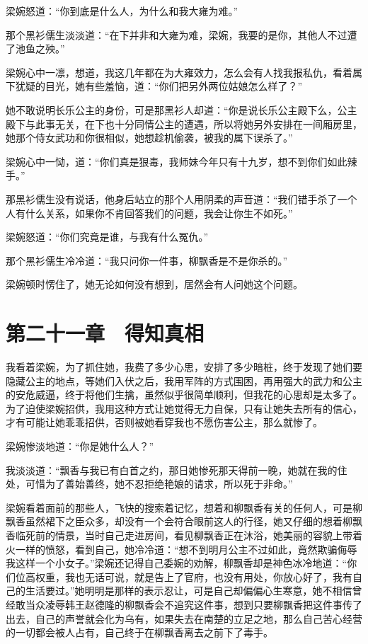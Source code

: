 梁婉怒道：“你到底是什么人，为什么和我大雍为难。”

那个黑衫儒生淡淡道：“在下并非和大雍为难，梁婉，我要的是你，其他人不过遭了池鱼之殃。”

梁婉心中一凛，想道，我这几年都在为大雍效力，怎么会有人找我报私仇，看着属下犹疑的目光，她有些羞恼，道：“你们把另外两位姑娘怎么样了？”

她不敢说明长乐公主的身份，可是那黑衫人却道：“你是说长乐公主殿下么，公主殿下与此事无关，在下也十分同情公主的遭遇，所以将她另外安排在一间厢房里，她那个侍女武功和你很相似，她想趁机偷袭，被我的属下误杀了。”

梁婉心中一恸，道：“你们真是狠毒，我师妹今年只有十九岁，想不到你们如此辣手。”

那黑衫儒生没有说话，他身后站立的那个人用阴柔的声音道：“我们错手杀了一个人有什么关系，如果你不肯回答我们的问题，我会让你生不如死。”

梁婉怒道：“你们究竟是谁，与我有什么冤仇。”

那个黑衫儒生冷冷道：“我只问你一件事，柳飘香是不是你杀的。”

梁婉顿时愣住了，她无论如何没有想到，居然会有人问她这个问题。

\chapter{第二十一章　得知真相}

我看着梁婉，为了抓住她，我费了多少心思，安排了多少暗桩，终于发现了她们要隐藏公主的地点，等她们入伏之后，我用军阵的方式围困，再用强大的武力和公主的安危威逼，终于将他们生擒，虽然似乎很简单顺利，但我花的心思却是太多了。为了迫使梁婉招供，我用这种方式让她觉得无力自保，只有让她失去所有的信心，才有可能让她乖乖招供，否则被她看穿我也不愿伤害公主，那么就惨了。

梁婉惨淡地道：“你是她什么人？”

我淡淡道：“飘香与我已有白首之约，那日她惨死那天得前一晚，她就在我的住处，可惜为了善始善终，她不忍拒绝艳娘的请求，所以死于非命。”

梁婉看着面前的那些人，飞快的搜索着记忆，想着和柳飘香有关的任何人，可是柳飘香虽然裙下之臣众多，却没有一个会符合眼前这人的行径，她又仔细的想着柳飘香临死前的情景，当时自己走进房间，看见柳飘香正在沐浴，她美丽的容貌上带着火一样的愤怒，看到自己，她冷冷道：“想不到明月公主不过如此，竟然欺骗侮辱我这样一个小女子。”梁婉还记得自己委婉的劝解，柳飘香却是神色冰冷地道：“你们位高权重，我也无话可说，就是告上了官府，也没有用处，你放心好了，我有自己的生活要过。”她明明是那样的表示忍让，可是自己却偏偏心生寒意，她不相信曾经敢当众凌辱韩王赵德隆的柳飘香会不追究这件事，想到只要柳飘香把这件事传了出去，自己的声誉就会化为乌有，如果失去在南楚的立足之地，那么自己苦心经营的一切都会被人占有，自己终于在柳飘香离去之前下了毒手。

